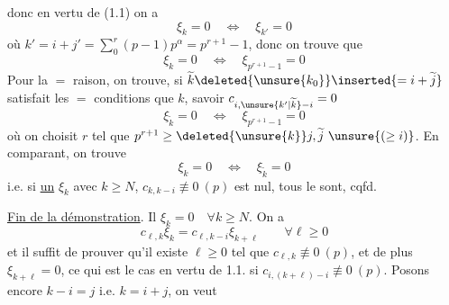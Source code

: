 donc en vertu de (1.1) on a
\[
\xi_k=0\quad\Longleftrightarrow\quad\xi_{k'}=0
\]
où $k'=i+j'=\sum_0^r(p-1)p^\alpha=p^{r+1}-1$,
donc on trouve que
\[
\xi_k=0\quad\Longleftrightarrow\quad\xi_{p^{r+1}-1}=0
\]
Pour la $=$ raison, on trouve, si $\widetilde k\deleted{\unsure{k_0}}\inserted{=i+\widetilde j}$ satisfait les $=$ conditions que $k$, savoir $c_{i,\unsure{k'|\widetilde k}-i}=0$
\[
\xi_{\widetilde k}=0\quad\Longleftrightarrow\quad\xi_{p^{r+1}-1}=0
\]
où on choisit $r$ tel que $p^{r+1}\geq\deleted{\unsure{k}}j,\widetilde j\ \unsure{(\geq i)}$.
En comparant, on trouve
\[
\xi_k=0\quad\Longleftrightarrow\quad\xi_{\widetilde k}=0
\]
i.e. si \uline{un} $\xi_k$ avec $k\geq N$, $c_{k,k-i}\not\equiv0\ (p)$ est nul, tous le sont, cqfd.

\uline{Fin de la démonstration}. Il   $\xi_k=0\quad\forall k\geq N$. On a
\[
c_{\ell,k}\xi_k=c_{\ell,k-i}\xi_{k+\ell}\qquad\forall\ell\geq0
\]
et il suffit de prouver qu'il existe $\ell\geq0$ tel que $c_{\ell,k}\not\equiv0\ (p)$, et de plus $\xi_{k+\ell}=0$, ce qui est le cas  en vertu de 1.1. si $c_{i,(k+\ell)-i}\not\equiv0\ (p)$. Posons encore $k-i=j$ i.e. $k=i+j$, on veut
